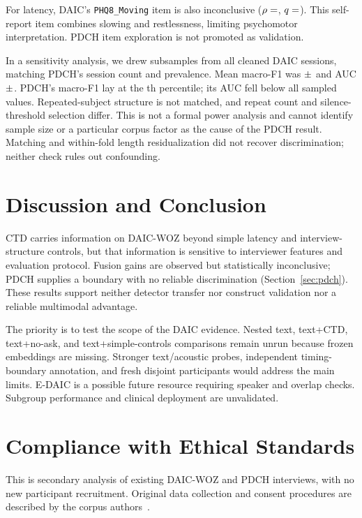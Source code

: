 \documentclass{article}
\begin{document}
For latency, DAIC's \texttt{PHQ8\_Moving} item is also inconclusive ($\rho=\R{movingLatencyr}$, $q=\R{movingLatencyq}$). This self-report item combines slowing and restlessness, limiting psychomotor interpretation. PDCH item exploration is not promoted as validation.

In a sensitivity analysis, we drew  subsamples from all  cleaned DAIC sessions, matching PDCH's session count and prevalence. Mean macro-F1 was $\R{powerFmean}\pm\R{powerFsd}$ and AUC $\R{powerAmean}\pm\R{powerAsd}$. PDCH's macro-F1 lay at the th percentile; its AUC fell below all sampled values. Repeated-subject structure is not matched, and repeat count and silence-threshold selection differ. This is not a formal power analysis and cannot identify sample size or a particular corpus factor as the cause of the PDCH result. Matching and within-fold length residualization did not recover discrimination; neither check rules out confounding.

\section{Discussion and Conclusion}
CTD carries information on DAIC-WOZ beyond simple latency and interview-structure controls, but that information is sensitive to interviewer features and evaluation protocol. Fusion gains are observed but statistically inconclusive; PDCH supplies a boundary with no reliable discrimination (Section~\ref{sec:pdch}). These results support neither detector transfer nor construct validation nor a reliable multimodal advantage.

The priority is to test the scope of the DAIC evidence. Nested text, text+CTD, text+no-ask, and text+simple-controls comparisons remain unrun because frozen embeddings are missing. Stronger text/acoustic probes, independent timing-boundary annotation, and fresh disjoint participants would address the main limits. E-DAIC is a possible future resource requiring speaker and overlap checks. Subgroup performance and clinical deployment are unvalidated.

\section{Compliance with Ethical Standards}
This is secondary analysis of existing DAIC-WOZ and PDCH interviews, with no new participant recruitment. Original data collection and consent procedures are described by the corpus authors~\cite{gratch2014daic,cao2025pdch}.



\end{document}
